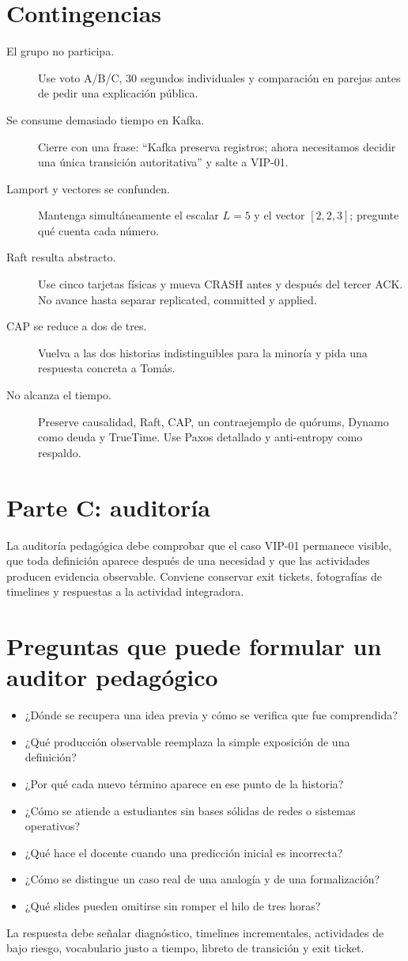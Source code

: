 \documentclass[variant=docente,cover=institutional,mode=screen]{ua-engineering-v6-article}
\begin{document}
\section{Contingencias}
\begin{description}
\item[El grupo no participa.] Use voto A/B/C, 30 segundos individuales y comparación en parejas antes de pedir una explicación pública.
\item[Se consume demasiado tiempo en Kafka.] Cierre con una frase: ``Kafka preserva registros; ahora necesitamos decidir una única transición autoritativa'' y salte a VIP-01.
\item[Lamport y vectores se confunden.] Mantenga simultáneamente el escalar $L=5$ y el vector $[2,2,3]$; pregunte qué cuenta cada número.
\item[Raft resulta abstracto.] Use cinco tarjetas físicas y mueva CRASH antes y después del tercer ACK. No avance hasta separar replicated, committed y applied.
\item[CAP se reduce a dos de tres.] Vuelva a las dos historias indistinguibles para la minoría y pida una respuesta concreta a Tomás.
\item[No alcanza el tiempo.] Preserve causalidad, Raft, CAP, un contraejemplo de quórums, Dynamo como deuda y TrueTime. Use Paxos detallado y anti-entropy como respaldo.
\end{description}

\section{Parte C: auditoría}
La auditoría pedagógica debe comprobar que el caso VIP-01 permanece visible, que toda definición aparece después de una necesidad y que las actividades producen evidencia observable. Conviene conservar exit tickets, fotografías de timelines y respuestas a la actividad integradora.

\section{Preguntas que puede formular un auditor pedagógico}
\begin{itemize}
\item ¿Dónde se recupera una idea previa y cómo se verifica que fue comprendida?
\item ¿Qué producción observable reemplaza la simple exposición de una definición?
\item ¿Por qué cada nuevo término aparece en ese punto de la historia?
\item ¿Cómo se atiende a estudiantes sin bases sólidas de redes o sistemas operativos?
\item ¿Qué hace el docente cuando una predicción inicial es incorrecta?
\item ¿Cómo se distingue un caso real de una analogía y de una formalización?
\item ¿Qué slides pueden omitirse sin romper el hilo de tres horas?
\end{itemize}
La respuesta debe señalar diagnóstico, timelines incrementales, actividades de bajo riesgo, vocabulario justo a tiempo, libreto de transición y exit ticket.
\end{document}

